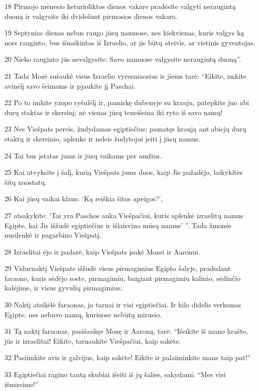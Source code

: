 \par 18 Pirmojo mėnesio keturioliktos dienos vakare pradėsite valgyti neraugintą duoną ir valgysite iki dvidešimt pirmosios dienos vakaro. 
\par 19 Septynias dienas nebus raugo jūsų namuose, nes kiekvienas, kuris valgys ką nors rauginto, bus išnaikintas iš Izraelio, ar jis būtų ateivis, ar vietinis gyventojas. 
\par 20 Nieko rauginto jūs nevalgysite. Savo namuose valgysite neraugintą duoną”. 
\par 21 Tada Mozė sušaukė visus Izraelio vyresniuosius ir jiems tarė: “Eikite, imkite avinėlį savo šeimoms ir pjaukite jį Paschai. 
\par 22 Po to imkite yzopo ryšulėlį ir, pamirkę dubenyje su krauju, patepkite juo abi durų staktas ir skersinį; nė vienas jūsų teneišeina iki ryto iš savo namų! 
\par 23 Nes Viešpats pereis, žudydamas egiptiečius; pamatęs kraują ant abiejų durų staktų ir skersinio, aplenks ir neleis žudytojui įeiti į jūsų namus. 
\par 24 Tai bus įstatas jums ir jūsų vaikams per amžius. 
\par 25 Kai atvyksite į šalį, kurią Viešpats jums duos, kaip Jis pažadėjo, laikykitės šitų nuostatų. 
\par 26 Kai jūsų vaikai klaus: ‘Ką reiškia šitos apeigos?’, 
\par 27 atsakykite: ‘Tai yra Paschos auka Viešpačiui, kuris aplenkė izraelitų namus Egipte, kai Jis išžudė egiptiečius ir išlaisvino mūsų namus’ ”. Tada žmonės nusilenkė ir pagarbino Viešpatį. 
\par 28 Izraelitai ėjo ir padarė, kaip Viešpats įsakė Mozei ir Aaronui. 
\par 29 Vidurnaktį Viešpats išžudė visus pirmagimius Egipto šalyje, pradedant faraono, kuris sėdėjo soste, pirmagimiu, baigiant pirmagimiu kalinio, sėdinčio kalėjime, ir visus gyvulių pirmagimius. 
\par 30 Naktį atsikėlė faraonas, jo tarnai ir visi egiptiečiai. Ir kilo didelis verksmas Egipte, nes nebuvo namų, kuriuose nebūtų mirusio. 
\par 31 Tą naktį faraonas, pasišaukęs Mozę ir Aaroną, tarė: “Išeikite iš mano krašto, jūs ir izraelitai! Eikite, tarnaukite Viešpačiui, kaip sakėte. 
\par 32 Pasiimkite avis ir galvijus, kaip sakėte! Eikite ir palaiminkite mane taip pat!” 
\par 33 Egiptiečiai ragino tautą skubiai išeiti iš jų šalies, sakydami: “Mes visi išmirsime!” 
